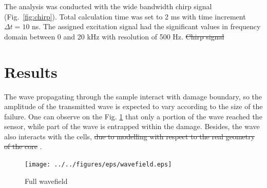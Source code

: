 \documentclass[materials,article,submit,moreauthors,pdftex]{Definitions/mdpi}
\providecommand{\DIFadd}[1]{{\protect\color{blue}{#1}}} %
\providecommand{\DIFdel}[1]{{\protect\color{red}\sout{#1}}}                      %
\providecommand{\DIFaddbegin}{} %
\providecommand{\DIFaddend}{} %
\providecommand{\DIFdelbegin}{} %
\providecommand{\DIFdelend}{} %
\providecommand{\DIFdelFL}[1]{\DIFdel{#1}} %
\begin{document}
\DIFaddend The analysis was conducted with the wide bandwidth chirp signal (Fig.~\ref{fig:chirp}).
Total calculation time was set to 2 ms with time increment \(\Delta t=10\) ns.
The assigned excitation signal had the significant values in frequency domain between 0 and 20 kHz with resolution of 500 Hz.
\DIFdelbegin %
{%
\DIFdelFL{Chirp signal}}
\DIFdelend \DIFaddbegin 

\DIFaddend \section{Results}
\label{sec:results}
The wave propagating through the sample interact with damage boundary, so the amplitude of the transmitted wave is expected to vary according to the size of the failure.
One can observe on the Fig. \ref{fig:wavefield} that only a portion of the wave reached the sensor, while part of the wave is entrapped within the damage.
Besides, the wave also interacts with the cells, \DIFdelbegin \DIFdel{due to modelling with respect to the real geometry of the core }\DIFdelend \DIFaddbegin \DIFadd{because each cell in the core was modelled individually}\DIFaddend .
\begin{figure}
	\begin{center}
		\texttt{[image: ../../figures/eps/wavefield.eps]}
	\end{center}
	\caption{Full wavefield}
	\label{fig:wavefield}
\end{figure}
\DIFdelbegin %
\end{document}
